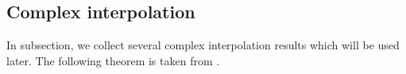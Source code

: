 \documentclass{amsart}
\numberwithin{equation}{section}
\newtheorem{lem}[thm]{Lemma}
\theoremstyle{definition}
\theoremstyle{remark}
\newcommand{\1}{\mathbf 1}
\newcommand{\BMO}{\mathrm{BMO}}
\begin{document}
%

\subsection{Complex interpolation}
 In  subsection, we collect several complex interpolation results which will be used later.
The following theorem is taken from \cite[Theorem 5.1.2]{BL1976}.
\end{document}
